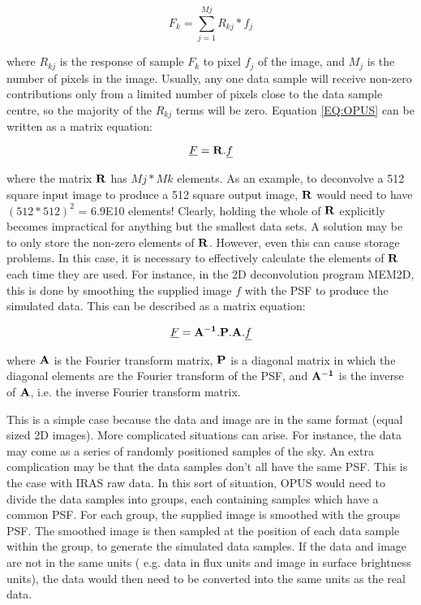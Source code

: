 \begin {equation}
F_{k}=\sum_{j=1}^{Mj} R_{kj}*f_{j}        \label {EQ:OPUS}
\end {equation}

where $R_{kj}$ is the response of sample $F_{k}$ to pixel $f_{j}$ of the
image, and $M_{j}$ is the number of pixels in the image.
Usually, any one data sample will receive non-zero contributions only
from a limited number of pixels close to the data sample centre, so the
majority of the $R_{kj}$ terms will be zero. Equation \ref{EQ:OPUS} can be
written as a matrix equation:

\begin {equation}
\underline{F}={\bf R}.\underline{f}		  \label {EQ:MATRIX_OPUS}
\end {equation}

where the matrix ${\bf R}$ has $Mj*Mk$ elements. As an example, to deconvolve a
512 square input image  to produce a 512 square output image, ${\bf R}$ would
need to have $(512*512)^{2}$ = 6.9E10  elements! Clearly, holding the whole of
${\bf R}$ explicitly becomes  impractical for anything but the smallest data
sets. A solution may be to only store the non-zero elements of ${\bf R}$.
However, even this can cause  storage problems. In this case, it is necessary
to effectively calculate the  elements of ${\bf R}$ each time they are used.
For instance, in the 2D  deconvolution program MEM2D, this is done by smoothing
the supplied image $f$ with  the PSF to produce the simulated data. This can be
described as a matrix  equation:

\begin {equation}
\underline{F}={\bf A^{-1}}.{\bf P}.{\bf A}.\underline{f} \label {EQ:MEM2D_OPUS}
\end {equation}

where ${\bf A}$ is the Fourier transform matrix, ${\bf P}$ is a diagonal matrix
in which the diagonal elements are the Fourier transform of the PSF, and ${\bf
A^{-1}}$ is  the inverse of ${\bf A}$, i.e. the inverse Fourier transform
matrix.

This is a simple case because the data  and image are in the same format (equal
sized 2D images). More complicated  situations can arise. For instance, the
data may come as a series of randomly  positioned samples of the sky. An extra
complication may be that the data samples don't all have the same PSF. This is
the case with IRAS raw data. In this sort of situation, OPUS would need to
divide the data samples into groups, each containing samples which have a
common PSF.  For each group, the supplied image is smoothed with the groups
PSF. The smoothed  image is then sampled at the position of each data sample
within the group, to  generate the simulated data samples. If the data and
image are not in the same  units ( e.g. data in flux units and image in surface
brightness units), the data would then need to be converted into the same units
as the real data.

